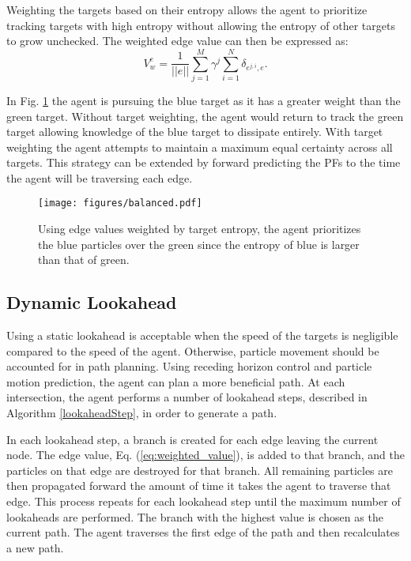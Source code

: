 \documentclass[letterpaper, 10 pt, conference]{ieeeconf}  %
\begin{document}
Weighting the targets based on their entropy allows the agent to prioritize tracking targets with high entropy without allowing the entropy of other targets to grow unchecked. The weighted edge value can then be expressed as:
\begin{equation}\label{eq:weighted_value}
    V_w^e = \frac{1}{||e||}\sum_{j=1}^M \gamma^j \sum_{i=1}^{N}\delta_{e^{j,i},e}.
\end{equation}

In Fig. \ref{fig:balanced} the agent is pursuing the blue target as it has a greater weight than the green target. Without target weighting, the agent would return to track the green target allowing knowledge of the blue target to dissipate entirely. With target weighting the agent attempts to maintain a maximum equal certainty across all targets. This strategy can be extended by forward predicting the PFs to the time the agent will be traversing each edge.

\begin{figure}
\centering
\texttt{[image: figures/balanced.pdf]}
\caption{Using edge values weighted by target entropy, the agent prioritizes the blue particles over the green since the entropy of blue is larger than that of green.}
\label{fig:balanced}
\end{figure}

\subsection{Dynamic Lookahead}
Using a static lookahead is acceptable when the speed of the targets is negligible compared to the speed of the agent. Otherwise, particle movement should be accounted for in path planning. Using receding horizon control and particle motion prediction, the agent can plan a more beneficial path. At each intersection, the agent performs a number of lookahead steps, described in Algorithm \ref{lookaheadStep}, in order to generate a path.

In each lookahead step, a branch is created for each edge leaving the current node. The edge value, Eq. (\ref{eq:weighted_value}), is added to that branch, and the particles on that edge are destroyed for that branch. All remaining particles are then propagated forward the amount of time it takes the agent to traverse that edge. This process repeats for each lookahead step until the maximum number of lookaheads are performed. The branch with the highest value is chosen as the current path. The agent traverses the first edge of the path and then recalculates a new path.
\end{document}

